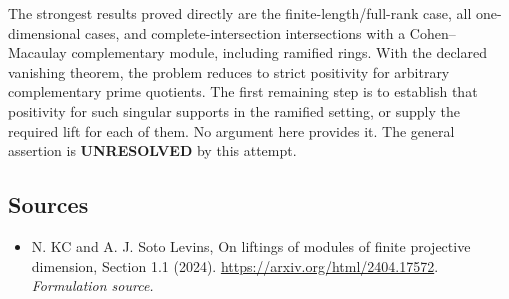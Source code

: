 \documentclass[11pt]{article}
\begin{document}
The strongest results proved directly are the finite-length/full-rank case, all one-dimensional cases, and complete-intersection intersections with a Cohen--Macaulay complementary module, including ramified rings. With the declared vanishing theorem, the problem reduces to strict positivity for arbitrary complementary prime quotients. The first remaining step is to establish that positivity for such singular supports in the ramified setting, or supply the required lift for each of them. No argument here provides it. The general assertion is \textbf{UNRESOLVED} by this attempt.

\subsection{Sources}
\begin{itemize}
\item[S1]N. KC and A. J. Soto Levins, On liftings of modules of finite projective dimension, Section 1.1 (2024).
\url{https://arxiv.org/html/2404.17572}.
\textit{Formulation source.}
\end{itemize}
\end{document}
